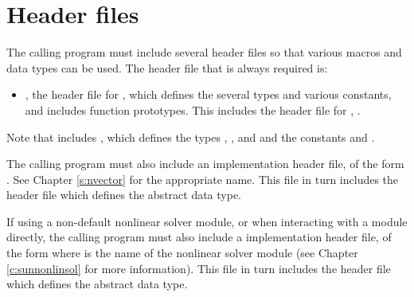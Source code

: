 \section{Header files}\label{ss:header_sim}
The calling program must include several header files so that various macros
and data types can be used. The header file that is always required is:
\begin{itemize}
\item  {},
  the header file for {\idas}, which defines the several
  types and various constants, and includes function prototypes.  This
  includes the header file for {\idals}, .
\end{itemize}
Note that  includes ,
which defines the types , , and 
and the constants  and .

The calling program must also include an {\nvector} implementation header file,
of the form \\ \noindent
{}.  See Chapter \ref{s:nvector} for the appropriate
name.  This file in turn includes the header file 
which defines the abstract  data type.

If using a non-default nonlinear solver module, or when interacting
with a {\sunnonlinsol} module directly, the calling program must also
include a {\sunnonlinsol} implementation header file, of the form
 where \id{***} is the name of the
nonlinear solver module (see Chapter \ref{c:sunnonlinsol} for more
information). This file in turn includes the header file
 which defines the abstract
 data type.

